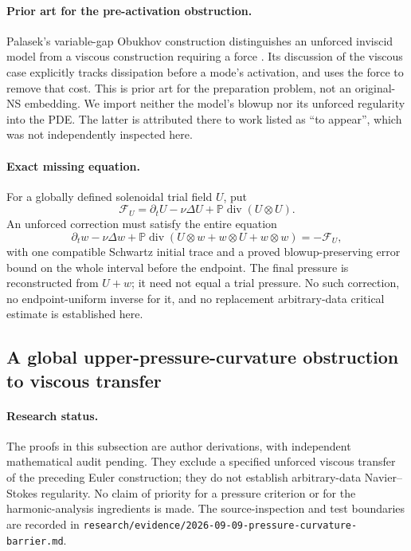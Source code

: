 \paragraph{Prior art for the pre-activation obstruction.}
Palasek's variable-gap Obukhov construction distinguishes an unforced
inviscid model from a viscous construction requiring a force
\cite{Palasek2026Obukhov}. Its discussion of the viscous case explicitly
tracks dissipation before a mode's activation, and uses the force to
remove that cost. This is prior art for the preparation problem, not an
original-NS embedding. We import neither the model's blowup nor its
unforced regularity into the PDE. The latter is attributed there to
work listed as ``to appear'', which was not independently inspected here.

\paragraph{Exact missing equation.}
For a globally defined solenoidal trial field $U$, put
\[
 \mathcal F_U=\partial_tU-\nu\Delta U+
                 \mathbb P\operatorname{div}(U\otimes U).
\]
An unforced correction must satisfy the entire equation
\[
 \partial_tw-\nu\Delta w+
 \mathbb P\operatorname{div}(U\otimes w+w\otimes U+w\otimes w)
       =-\mathcal F_U,
\]
with one compatible Schwartz initial trace and a proved
blowup-preserving error bound on the whole interval before the endpoint.
The final pressure is reconstructed from $U+w$; it need not equal a trial
pressure. No such correction, no endpoint-uniform inverse for it, and no
replacement arbitrary-data critical estimate is established here.

\subsection{A global upper-pressure-curvature obstruction to viscous transfer}
\label{pc:section}

\paragraph{Research status.}
The proofs in this subsection are author derivations, with independent
mathematical audit pending. They exclude a specified unforced viscous
transfer of the preceding Euler construction; they do not establish
arbitrary-data Navier--Stokes regularity. No claim of priority for a
pressure criterion or for the harmonic-analysis ingredients is made.
The source-inspection and test boundaries are recorded in
\texttt{research/evidence/2026-09-09-pressure-curvature-barrier.md}.


